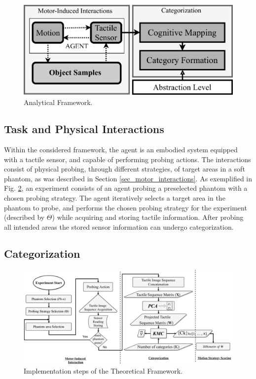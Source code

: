 \begin{figure}[]
	\centering
	\includegraphics[width=\columnwidth]{./figs/conceptual_framework}
	\caption{Analytical Framework.}
	\label{conceptual_map}
\end{figure}

\subsection{Task and Physical Interactions}\label{sec_int}
Within the considered framework, the agent is an embodied system equipped with a tactile sensor, and capable of performing probing actions. The interactions consist of physical probing, through different strategies, of target areas in a soft phantom, as was described in Section \ref{sec_motor_interactions}.
As exemplified in Fig. \ref{self_org_processing}, an experiment consists of an agent probing a preselected phantom 
with a chosen probing strategy. The agent iteratively selects a target area in the phantom to probe, and performs 
the chosen probing strategy for the experiment (described by $\Theta$) while acquiring and storing tactile 
information. After probing all intended areas the stored sensor information can undergo categorization.

\subsection{Categorization}\label{sec_categorization}

\begin{figure}[]
	\centering
	\includegraphics[width=.8\textwidth]{./figs/motion_primitive_preprocessing.pdf}
	\caption{Implementation steps of the Theoretical Framework.} %
	\label{self_org_processing}
\end{figure}

